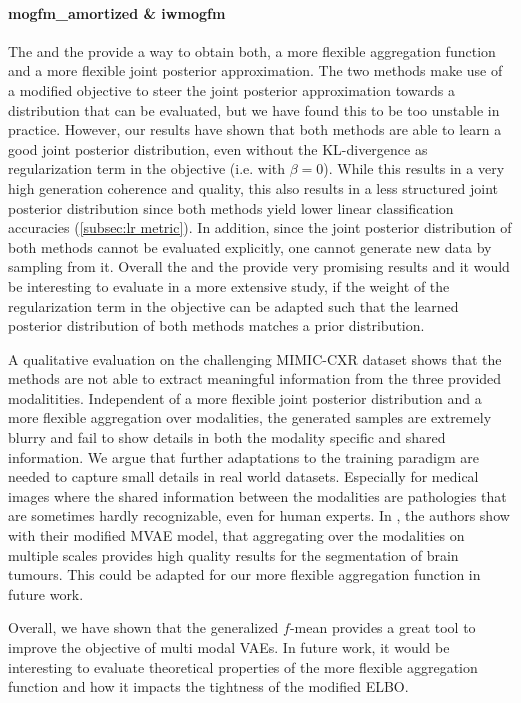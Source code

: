 \paragraph{mogfm\_amortized \& iwmogfm}
The  and the  provide a way to obtain both, a more flexible aggregation function and a more flexible joint posterior approximation.
The two methods make use of a modified objective to steer the joint posterior approximation towards a distribution that can be evaluated, but we have found this to be too unstable in practice.
However, our results have shown that both methods are able to learn a good joint posterior distribution, even without the KL-divergence as regularization term in the objective (i.e. with $\beta = 0$).
While this results in a very high generation coherence and quality, this also results in a less structured joint posterior distribution since both methods yield lower linear classification accuracies (\cref{subsec:lr metric}).
In addition, since the joint posterior distribution of both methods cannot be evaluated explicitly, one cannot generate new data by sampling from it.
Overall the  and the  provide very promising results and it would be interesting to evaluate in a more extensive study, if the weight of the regularization term in the objective can be adapted such that the learned posterior distribution of both methods matches a prior distribution.


A qualitative evaluation on the challenging MIMIC-CXR dataset shows that the methods are not able to extract meaningful information from the three provided modalitities.
Independent of a more flexible joint posterior distribution and a more flexible aggregation over modalities, the generated samples are extremely blurry and fail to show details in both the modality specific and shared information.
We argue that further adaptations to the training paradigm are needed to capture small details in real world datasets.
Especially for medical images where the shared information between the modalities are pathologies that are sometimes hardly recognizable, even for human experts.
In \citep{dorent_hetero-modal_2019}, the authors show with their modified MVAE model, that aggregating over the modalities on multiple scales provides high quality results for the segmentation of brain tumours.
This could be adapted for our more flexible aggregation function in future work.

Overall, we have shown that the generalized $f$-mean provides a great tool to improve the objective of multi modal VAEs.
In future work, it would be interesting to evaluate theoretical properties of the more flexible aggregation function and how it impacts the tightness of the modified ELBO.